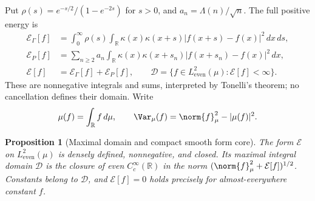 \documentclass[11pt,a4paper]{article}
\numberwithin{equation}{section}
\newtheorem{proposition}[theorem]{Proposition}
\theoremstyle{definition}\newtheorem{definition}[theorem]{Definition}
\theoremstyle{remark}\newtheorem{remark}[theorem]{Remark}
\newcommand{\R}{\mathbb R}\newcommand{\C}{\mathbb C}\newcommand{\N}{\mathbb N}
\newcommand{\E}{\mathcal E}\newcommand{\D}{\mathcal D}
\newcommand{\He}{L^2_{\mathrm{even}}(\mu)}\newcommand{\Le}{L^2_{\mathrm{even}}(dx)}
\begin{document}
Put $\rho(s)=e^{-s/2}/(1-e^{-2s})$ for $s>0$, and $a_n=\Lambda(n)/\sqrt n$. The full positive energy is
\begin{align}
 \E_\Gamma[f]&=\int_0^\infty\rho(s)\int_\R
       \kappa(x)\kappa(x+s)|f(x+s)-f(x)|^2\,dx\,ds,\label{a:eq:Eg}\\
 \E_P[f]&=\sum_{n\ge2}a_n\int_\R
       \kappa(x)\kappa(x+s_n)|f(x+s_n)-f(x)|^2\,dx,\label{a:eq:Ep}\\
 \E[f]&=\E_\Gamma[f]+\E_P[f],\qquad
 \D=\{f\in\He:\E[f]<\infty\}.\label{a:eq:Edomain}
\end{align}
These are nonnegative integrals and sums, interpreted by Tonelli's theorem; no cancellation defines their domain. Write
\[
 \mu(f)=\int_\R f\,d\mu,\qquad
 \Var_\mu(f)=\norm{f}_\mu^2-|\mu(f)|^2.
\]

\begin{proposition}[Maximal domain and compact smooth form core]\label{a:prop:core}
The form $\E$ on $\He$ is densely defined, nonnegative, and closed. Its maximal integral domain $\D$ is the closure of even $C_c^\infty(\R)$ in the norm $(\norm{f}_\mu^2+\E[f])^{1/2}$. Constants belong to $\D$, and $\E[f]=0$ holds precisely for almost-everywhere constant $f$.
\end{proposition}
\end{document}
